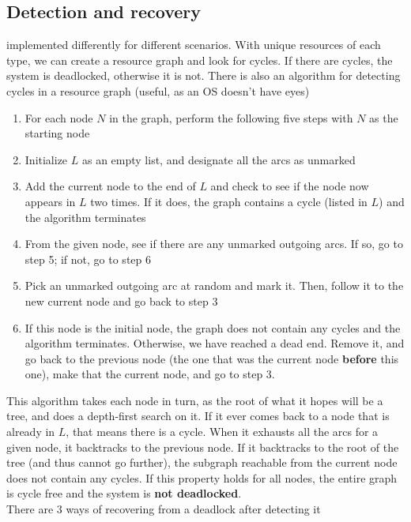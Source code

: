 \documentclass{article}
\begin{document}
\subsection*{Detection and recovery}
implemented differently for different scenarios. With unique resources of each type, we can create a resource graph and look for cycles. If there are cycles, the system is deadlocked, otherwise it is not. There is also an algorithm for detecting cycles in a resource graph (useful, as an OS doesn't have eyes)
\begin{enumerate}
	\item For each node $N$ in the graph, perform the following five steps with $N$ as the starting node
	\item Initialize $L$ as an empty list, and designate all the arcs as unmarked
	\item Add the current node to the end of $L$ and check to see if the node now appears in $L$ two times. If it does, the graph contains a cycle (listed in $L$) and the algorithm terminates
	\item From the given node, see if there are any unmarked outgoing arcs. If so, go to step 5; if not, go to step 6
	\item Pick an unmarked outgoing arc at random and mark it. Then, follow it to the new current node and go back to step 3
	\item If this node is the initial node, the graph does not contain any cycles and the algorithm terminates. Otherwise, we have reached a dead end. Remove it, and go back to the previous node (the one that was the current node \textbf{before} this one), make that the current node, and go to step 3.
\end{enumerate}
This algorithm takes each node in turn, as the root of what it hopes will be a tree, and does a depth-first search on it. If it ever comes back to a node that is already in $L$, that means there is a cycle. When it exhausts all the arcs for a given node, it backtracks to the previous node. If it backtracks to the root of the tree (and thus cannot go further), the subgraph reachable from the current node does not contain any cycles. If this property holds for all nodes, the entire graph is cycle free and the system is \textbf{not deadlocked}.
\\There are 3 ways of recovering from a deadlock after detecting it
\end{document}
